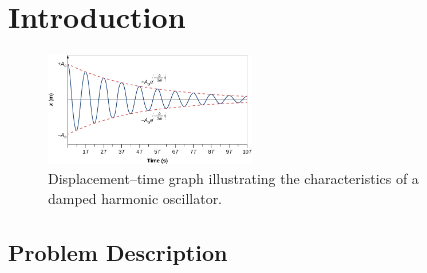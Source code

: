 \section{Introduction}

\begin{figure}
    \centering
    \includegraphics[width=0.48\textwidth]{images/damped_shm.png}
    \caption{Displacement–time graph illustrating the characteristics of a damped harmonic oscillator.}
    \label{fig:NTNU-letters}
\end{figure}

\lipsum[1-2]

\subsection{Problem Description}
\lipsum[2-3]

